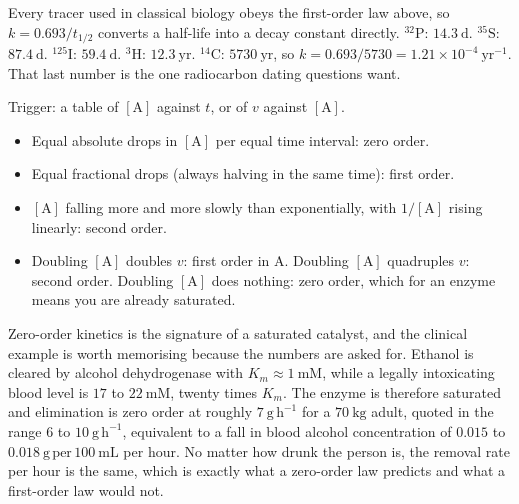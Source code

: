 \begin{obsbox}[title={WORTH NOTICING: the isotope half-lives an exam expects}]
Every tracer used in classical biology obeys the first-order law above, so
$k=0.693/t_{1/2}$ converts a half-life into a decay constant directly.
$^{32}\mathrm{P}$: $14.3\ \mathrm{d}$. $^{35}\mathrm{S}$: $87.4\ \mathrm{d}$.
$^{125}\mathrm{I}$: $59.4\ \mathrm{d}$. $^{3}\mathrm{H}$: $12.3\ \mathrm{yr}$.
$^{14}\mathrm{C}$: $5730\ \mathrm{yr}$, so
$k=0.693/5730=1.21\times10^{-4}\ \mathrm{yr^{-1}}$. That last number is the one
radiocarbon dating questions want.
\end{obsbox}

\begin{tipbox}[title={TECHNIQUE: deciding the order from a data table in thirty seconds}]
Trigger: a table of $[\mathrm{A}]$ against $t$, or of $v$ against $[\mathrm{A}]$.
\begin{itemize}
\item Equal absolute drops in $[\mathrm{A}]$ per equal time interval: zero order.
\item Equal fractional drops (always halving in the same time): first order.
\item $[\mathrm{A}]$ falling more and more slowly than exponentially, with
$1/[\mathrm{A}]$ rising linearly: second order.
\item Doubling $[\mathrm{A}]$ doubles $v$: first order in A. Doubling $[\mathrm{A}]$
quadruples $v$: second order. Doubling $[\mathrm{A}]$ does nothing: zero order,
which for an enzyme means you are already saturated.
\end{itemize}
\end{tipbox}

Zero-order kinetics is the signature of a saturated catalyst, and the clinical example
is worth memorising because the numbers are asked for. Ethanol is cleared by alcohol
dehydrogenase with $K_m\approx 1\ \mathrm{mM}$, while a legally intoxicating blood level
is $17$ to $22\ \mathrm{mM}$, twenty times $K_m$. The enzyme is therefore saturated and
elimination is zero order at roughly $7\ \mathrm{g\,h^{-1}}$ for a $70\ \mathrm{kg}$
adult, quoted in the range $6$ to $10\ \mathrm{g\,h^{-1}}$, equivalent to a fall in
blood alcohol concentration of $0.015$ to $0.018\ \mathrm{g\,per\,100\ mL}$ per hour.
No matter how drunk the person is, the removal rate per hour is the same, which is
exactly what a zero-order law predicts and what a first-order law would not.


